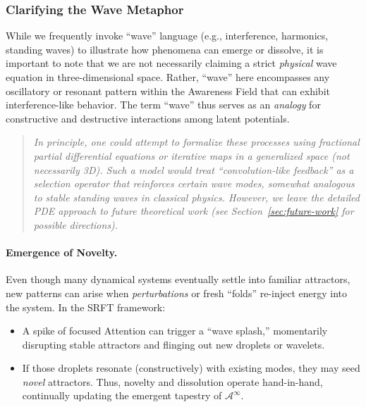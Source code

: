 \documentclass[12pt,a4paper]{article}
\begin{document}

\subsubsection{Clarifying the Wave Metaphor}

\noindent
While we frequently invoke ``wave'' language (e.g., interference, harmonics, standing waves) to illustrate how phenomena can emerge or dissolve, 
it is important to note that we are not necessarily claiming a strict \emph{physical} wave equation in three-dimensional space.
Rather, ``wave'' here encompasses any oscillatory or resonant pattern within the Awareness Field that can exhibit interference-like behavior.
The term ``wave'' thus serves as an \emph{analogy} for constructive and destructive interactions among latent potentials.

\begin{quote}
\textit{In principle, one could attempt to formalize these processes using fractional partial differential equations or iterative maps in a generalized space (not necessarily 3D). 
Such a model would treat ``convolution-like feedback'' as a selection operator that reinforces certain wave modes, somewhat analogous to stable standing waves in classical physics.
However, we leave the detailed PDE approach to future theoretical work (see Section~\ref{sec:future-work} for possible directions).}
\end{quote}


\paragraph{Emergence of Novelty.}
Even though many dynamical systems eventually settle into familiar attractors, new
patterns can arise when \emph{perturbations} or fresh “folds” re-inject energy into
the system. In the SRFT framework:
\begin{itemize}
    \item A spike of focused Attention can trigger a “wave splash,” momentarily
    disrupting stable attractors and flinging out new droplets or wavelets.
    \item If those droplets resonate (constructively) with existing modes, they may
    seed \emph{novel} attractors. Thus, novelty and dissolution operate hand-in-hand,
    continually updating the emergent tapestry of \(\mathscr{A}^\infty\).
\end{itemize}
\end{document}
